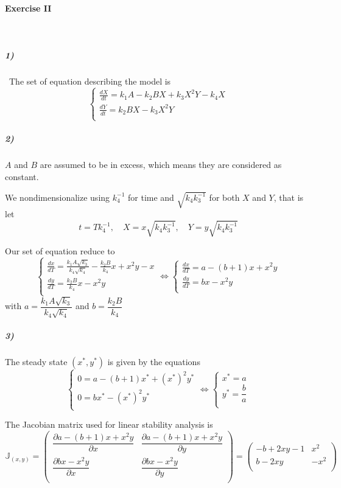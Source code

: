 \documentclass{article}
\begin{document}
\paragraph{Exercise II}
\

\subparagraph{1)}
\
The set of equation describing the model is 
$$ \displaystyle \left \{
    \begin{array}{l}
        \frac{dX}{dt}=k_1 A -k_2 B X  +k_3 X^2 Y -k_4 X \\
		\frac{dY}{dt}= k_2 B X -k_3 X^2 Y \\
    \end{array}
\right. $$

\subparagraph{2)}
$A$ and $B$ are assumed to be in excess, which means they are considered as constant. 

We nondimensionalize using $k_4^{-1}$ for time and $\sqrt{ k_4 k_3^{-1}}$ for both $X$ and $Y$, that is let  
$$ t = T k_4^{-1} , \quad X=x\sqrt{ k_4 k_3^{-1}}, \quad Y=y\sqrt{ k_4 k_3^{-1}}  $$

Our set of equation reduce to 
$$ \displaystyle \left \{
    \begin{array}{l}
        \frac{dx}{dT}=\frac{k_1 A\sqrt{k_3}}{k_4\sqrt{k_4}} - \frac{k_2 B}{k_4} x  +x^2 y -x  \\
		\frac{dy}{dT}= \frac{k_2 B}{k_4} x  -x^2 y\\
    \end{array}
    \right.
    \iff
    \left \{
    \begin{array}{l}
        \frac{dx}{dT}=a-(b+1)x +x^2 y \\
		\frac{dy}{dT}=bx -x^2 y \\
    \end{array}
\right. $$
with $a=\dfrac{k_1 A\sqrt{k_3}}{k_4\sqrt{k_4}}$ and $b=\dfrac{k_2 B}{k_4}$
\subparagraph{3)}
The steady state $(x^*,y^*)$ is given by the equations
$$ \displaystyle 
    \left \{
    \begin{array}{l}
        0=a-(b+1)x^* +(x^{*})^2 y^* \\
		0=bx^* -(x^{*})^2 y^* \\
    \end{array}
\right.
\iff
\left \{
    \begin{array}{l}
        x^*=a \\
		y^*=\dfrac{b}{a} \\
    \end{array}
\right.
 $$

The Jacobian matrix used for linear stability analysis is 
$$
\mathbb{J}_{(x,y)}=
\left(
\begin{array}{cc}
 \dfrac{\partial a-(b+1)x +x^2 y}{\partial x} & \dfrac{\partial a-(b+1)x +x^2 y}{\partial y} \\
\dfrac{\partial bx -x^2 y}{\partial x} & \dfrac{\partial bx -x^2 y}{\partial y} \\
\end{array}
\right)
=
\left(
\begin{array}{cc}
 -b+2 x y-1 & x^2 \\
 b-2 x y & -x^2 \\
\end{array}
\right)
$$
\end{document}
